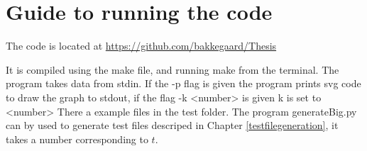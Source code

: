 \chapter{Guide to running the code}
The code is located at \url{https://github.com/bakkegaard/Thesis}

It is compiled using the make file, and running make from the terminal. The
program takes data from stdin. If the -p flag is given the program prints svg
code to draw the graph to stdout, if the flag -k <number> is given k is set to
<number> 
There a example files in the test folder.
The program generateBig.py can by used to generate test files descriped in
Chapter \ref{testfilegeneration}, it takes a number corresponding to $t$.
